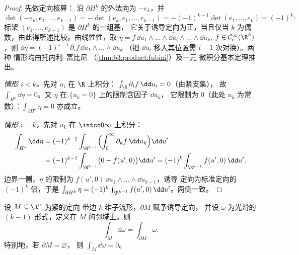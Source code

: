 \begin{proof}
先做定向核算：
沿 $\partial H^k$ 的外法向为 $-e_k$，并
\[
\det(-e_k, e_1, \dots, e_{k-1}) =
-\det(e_k, e_1, \dots, e_{k-1}) = -(-1)^{k-1}\det(e_1,
\dots, e_k) = (-1)^k :
\]
标架 $(e_1, \dots, e_{k-1})$ 是 $\partial H^k$ 的一组基，
它关于诱导定向为正，当且仅当 $k$
为偶数，由此得所述比较。由线性性，取 $\eta
= f\,\dd u_1\wedge\dots\wedge\widehat{\dd
u_i}\wedge\dots\wedge\dd u_k$, $f \in \mathcal
C^\infty_c(\R^k)$，则 $\dd\eta =
(-1)^{i-1}\,\partial_if\,\dd u_1\wedge\dots\wedge\dd u_k$
（把 $\dd u_i$ 移入其位置需 $i - 1$ 次对换）。两种
情形均由托内利--富比尼
（\cref{thm:b3:product:fubini}）及一元
微积分基本定理推出。

\emph{情形 $i < k$。}先对 $u_i$ 在 $\R$ 上积分：
$\int_\R\partial_if\,\dd u_i = 0$（由紧支集），
故 $\int_{H^k}\dd\eta = 0$。又 $\eta$ 在
$\{u_k = 0\}$ 上的限制含因子 $\dd u_k$，
它限制为 $0$（此处 $u_k$ 为常数）：$\int_{\partial H^k}\eta =
0$ 亦成立。

\emph{情形 $i = k$。}先对 $u_k$
在 $\intco0\infty$ 上积分：
\begin{align*}
\int_{H^k}\dd\eta &= (-1)^{k-1}\int_{\R^{k-1}}
\Bigl(\int_0^\infty\partial_kf\,\dd u_k\Bigr)\dd u' \\
&= (-1)^{k-1}\int_{\R^{k-1}}\bigl(0 - f(u', 0)\bigr)\dd u'
= (-1)^k\int_{\R^{k-1}}f(u',0)\,\dd u' .
\end{align*}
边界一侧，$\eta$ 的限制为 $f(u',
0)\,\dd u_1\wedge\dots\wedge\dd u_{k-1}$，诱导
定向为标准定向的 $(-1)^k$ 倍，于是
$\int_{\partial H^k}\eta =
(-1)^k\int_{\R^{k-1}}f(u',0)\,\dd u'$。两侧一致。
\end{proof}

\begin{theorem}[斯托克斯]\label{thm:b3:forms:stokes}
设 $M \subseteq \R^n$ 为紧的定向
带边 $k$ 维子流形，$\partial M$ 赋予诱导定向，
并设 $\omega$ 为光滑的 $(k-1)$ 形式，定义在
$M$ 的邻域上。则
\[
\int_M\dd\omega = \int_{\partial M}\omega .
\]
特别地，若 $\partial M = \varnothing$，
则 $\int_M\dd\omega = 0$。
\end{theorem}


